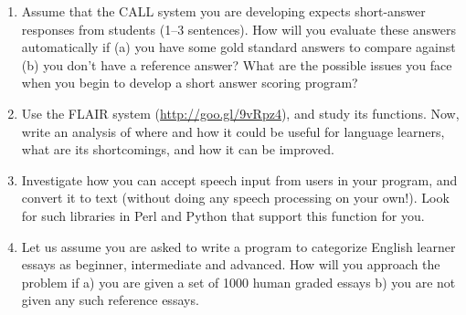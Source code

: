 \documentclass[11pt,a4paper]{article}
\begin{document}
\begin{enumerate}
\item Assume that the CALL system you are developing expects short-answer responses from students (1--3 sentences). How will you evaluate these answers automatically if (a) you have some gold standard answers to compare against (b) you don't have a reference answer? What are the possible issues you face when you begin to develop a short answer scoring program?
\item Use the FLAIR system (\url{http://goo.gl/9vRpz4}), and study its functions. Now, write an analysis of where and how it could be useful for language learners, what are its shortcomings, and how it can be improved.
\item Investigate how you can accept speech input from users in your program, and convert it to text (without doing any speech processing on your own!). Look for such libraries in Perl and Python that support this function for you.
\item Let us assume you are asked to write a program to categorize English learner essays as beginner, intermediate and advanced. How will you approach the problem if a) you are given a set of 1000 human graded essays b) you are not given any such reference essays.
\end{enumerate}
\end{document}
